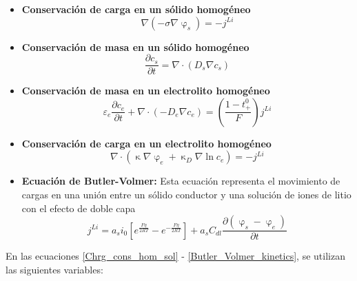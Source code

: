 \documentclass[10pt,a4paper]{article}
\begin{document}
\begin{itemize}
    \item \textbf{Conservaci\'on de carga en un s\'olido homog\'eneo}
        \begin{equation}
            \nabla (-\sigma\nabla\upvarphi_s)=-j^{Li} 
            \label{Chrg_cons_hom_sol}
        \end{equation}	
    \item \textbf{Conservaci\'on de masa en un s\'olido homog\'eneo}
        \begin{equation}
            \frac{\partial c_s}{\partial t}=\nabla \cdot (D_s\nabla c_s) 
            \label{Mass_cons_hom_sol}
        \end{equation}	
    \item \textbf{Conservaci\'on de masa en un electrolito homog\'eneo}
        \begin{equation}
            \varepsilon_e\frac{\partial c_e}{\partial t} + \nabla \cdot
            (-D_e\nabla c_e) = \left(\frac{1-t_+^0}{F}\right)j^{Li}
            \label{Mass_cons_hom_electrolyte}
        \end{equation}	
    \item \textbf{Conservaci\'on de carga en un electrolito homog\'eneo}
        \begin{equation}
            \nabla \cdot (\upkappa \nabla \upvarphi_e + \upkappa_D \nabla \ln 
            c_e) = -j^{Li}
            \label{Chrg_cons_hom_electrolyte}
        \end{equation}	
    \item \textbf{Ecuaci\'on de Butler-Volmer:} Esta ecuaci\'on representa el
        movimiento de cargas en una uni\'on entre un s\'olido conductor y una
        soluci\'on de iones de litio con el efecto de doble capa
        \begin{equation}
            j^{Li} =
            a_si_0\left[{e^\frac{F\eta}{2RT}-e^{-\frac{F\eta}{2RT}}}\right] + 
            a_sC_{dl}\frac{\partial{(\upvarphi_s - \upvarphi_e)}}{\partial t}
            \label{Butler_Volmer_kinetics}
        \end{equation}	
\end{itemize}

En las ecuaciones \ref{Chrg_cons_hom_sol} - \ref{Butler_Volmer_kinetics}, se 
utilizan las siguientes variables:
\end{document}
